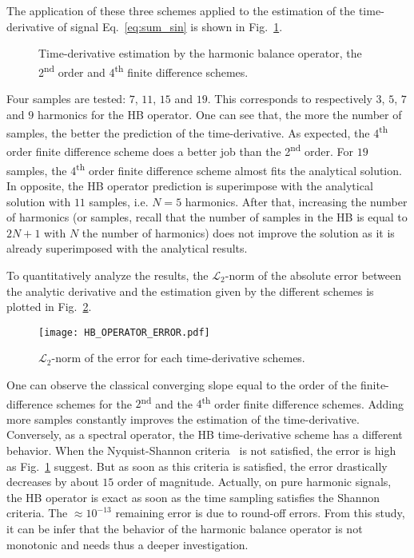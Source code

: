 The application of these three schemes applied 
to the estimation of the time-derivative of signal Eq.~\eqref{eq:sum_sin}
is shown
in Fig.~\ref{fig:hb_operator_sample}.
\begin{figure}[htbp]
  \centering
  \caption{Time-derivative estimation by the harmonic balance operator,
  the 2\textsuperscript{nd} order and 4\textsuperscript{th} finite difference schemes.}
  \label{fig:hb_operator_sample}
\end{figure}
Four samples
are tested: $7$, $11$, $15$ and $19$. This corresponds
to respectively $3$, $5$, $7$ and $9$ harmonics
for the HB operator. One can see that, the more the number
of samples, the better the prediction of the time-derivative.
As expected, the 4\textsuperscript{th} order finite difference
scheme does a better job than the 2\textsuperscript{nd} order.
For $19$ samples, the 4\textsuperscript{th} order finite difference
scheme almost fits the analytical solution. In opposite,
the HB operator prediction is superimpose with the analytical solution
with $11$ samples, i.e. $N=5$ harmonics. After that, increasing the
number of harmonics (or samples, recall that the number of samples
in the HB is equal to $2N+1$ with $N$ the number of harmonics)
does not improve the solution as it is already superimposed with
the analytical results.

To quantitatively analyze the results, the 
$\mathcal{L}_2$-norm of the absolute error between the analytic
derivative and the estimation given by the different schemes
is plotted in Fig.~\ref{fig:hb_operator_error}.
\begin{figure}[htb]
  \centering
   \texttt{[image: HB\_OPERATOR\_ERROR.pdf]}
   \caption{$\mathcal{L}_2$-norm of the error for each time-derivative
   schemes.}
  \label{fig:hb_operator_error}
\end{figure}
One can observe the classical converging slope
equal to the order of the finite-difference schemes for the
$2$\textsuperscript{nd} and the $4$\textsuperscript{th}
order finite difference schemes. 
Adding more samples constantly improves the estimation of 
the time-derivative.
Conversely, as a spectral operator, the HB time-derivative scheme 
has a different behavior. When the Nyquist-Shannon 
criteria~\cite{Nyquist1928, Shannon1949} is not
satisfied, the error is high as Fig.~\ref{fig:hb_operator_sample}
suggest. But as soon as this criteria is satisfied, the error
drastically decreases by about $15$ order of magnitude.
Actually, on pure
harmonic signals, the HB operator is exact as soon as the time
sampling satisfies the Shannon criteria. The $\approx 10^{-13}$
remaining error is due to round-off errors.
From this study, it can be infer that the behavior
of the harmonic balance operator is not monotonic
and needs thus a deeper investigation.
